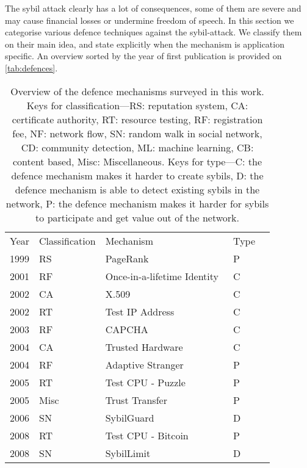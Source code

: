 The sybil attack clearly has a lot of consequences, some of them are severe and
may cause financial losses or undermine freedom of speech. In this section we
categorise various defence techniques against the sybil-attack. We classify them
on their main idea, and state explicitly when the mechanism is application
specific. An overview sorted by the year of first publication is provided on
\autoref{tab:defences}.

\begin{table}[]
\centering
\caption{Overview of the defence mechanisms surveyed in this work. Keys for
  classification---RS: reputation system, CA: certificate authority, RT:
  resource testing, RF: registration fee, NF: network flow, SN: random walk in
  social network, CD: community detection, ML: machine learning, CB: content
  based, Misc: Miscellaneous. Keys for type---C: the defence mechanism makes it
  harder to create sybils, D: the defence mechanism is able to detect existing
  sybils in the network, P: the defence mechanism makes it harder for sybils to
  participate and get value out of the network.}
\label{tab:defences}
\begin{tabular}{lllll}
  Year & Classification & Mechanism & Type &  \\
  1999 & RS &  PageRank~\cite{page1999pagerank} & P &  \\
  2001 & RF & Once-in-a-lifetime Identity~\cite{resnick2001social} & C &  \\
  2002 & CA &  X.509~\cite{housley2002internet} & C &  \\
  2002 & RT & Test IP Address~\cite{freedman2002tarzan} & C &  \\
  2003 & RF & CAPCHA~\cite{von2003captcha} & C &  \\
  2004 & CA &  Trusted Hardware~\cite{newsome2004sybil} & C &  \\
  2004 & RF & Adaptive Stranger~\cite{feldman2004robust} & P &  \\
  2005 & RT &  Test CPU - Puzzle~\cite{aspnes2005exposing} & P & \\
  2005 & Misc & Trust Transfer~\cite{seigneur2005trust} & P &  \\
  2006 & SN & SybilGuard~\cite{yu2006sybilguard} & D &  \\
  2008 & RT &  Test CPU - Bitcoin~\cite{nakamoto2008bitcoin} & P & \\
  2008 & SN & SybilLimit~\cite{yu2008sybillimit} & D &  \\

\end{tabular}
\end{table}
